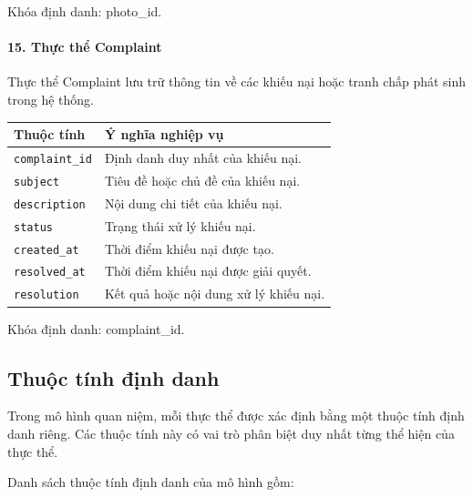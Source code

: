Khóa định danh: photo\_id.

\paragraph{15. Thực thể Complaint}\mbox{}\par

Thực thể Complaint lưu trữ thông tin về các khiếu nại hoặc tranh chấp phát sinh trong hệ thống.

\begin{center}
\scriptsize
\begin{tabular}{p{.25\linewidth} p{.65\linewidth}}
\toprule
Thuộc tính & Ý nghĩa nghiệp vụ \\
\midrule
\texttt{complaint\_id} & Định danh duy nhất của khiếu nại. \\
\texttt{subject} & Tiêu đề hoặc chủ đề của khiếu nại. \\
\texttt{description} & Nội dung chi tiết của khiếu nại. \\
\texttt{status} & Trạng thái xử lý khiếu nại. \\
\texttt{created\_at} & Thời điểm khiếu nại được tạo. \\
\texttt{resolved\_at} & Thời điểm khiếu nại được giải quyết. \\
\texttt{resolution} & Kết quả hoặc nội dung xử lý khiếu nại. \\
\bottomrule
\end{tabular}
\end{center}

Khóa định danh: complaint\_id.

\subsection{Thuộc tính định danh}

Trong mô hình quan niệm, mỗi thực thể được xác định bằng một thuộc tính định danh riêng. Các thuộc tính này có vai trò phân biệt duy nhất từng thể hiện của thực thể.

Danh sách thuộc tính định danh của mô hình gồm:


